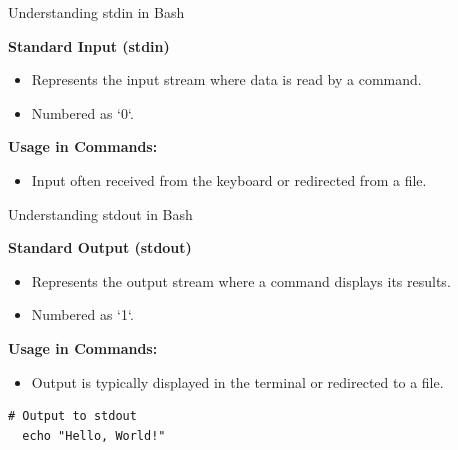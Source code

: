 \documentclass{beamer}
\begin{document}
\begin{frame}[fragile]{Understanding stdin in Bash}

  \textbf{Standard Input (stdin)}

  \begin{itemize}
    \item Represents the input stream where data is read by a command.
    \item Numbered as `0`.
  \end{itemize}

  \textbf{Usage in Commands:}

  \begin{itemize}
    \item Input often received from the keyboard or redirected from a file.
  \end{itemize}
\end{frame}

\begin{frame}[fragile]{Understanding stdout in Bash}

  \textbf{Standard Output (stdout)}

  \begin{itemize}
    \item Represents the output stream where a command displays its results.
    \item Numbered as `1`.
  \end{itemize}

  \textbf{Usage in Commands:}

  \begin{itemize}
    \item Output is typically displayed in the terminal or redirected to a file.
  \end{itemize}

  \begin{lstlisting}[frame=none]
  # Output to stdout
  echo "Hello, World!"
  \end{lstlisting}

\end{frame}
\end{document}
